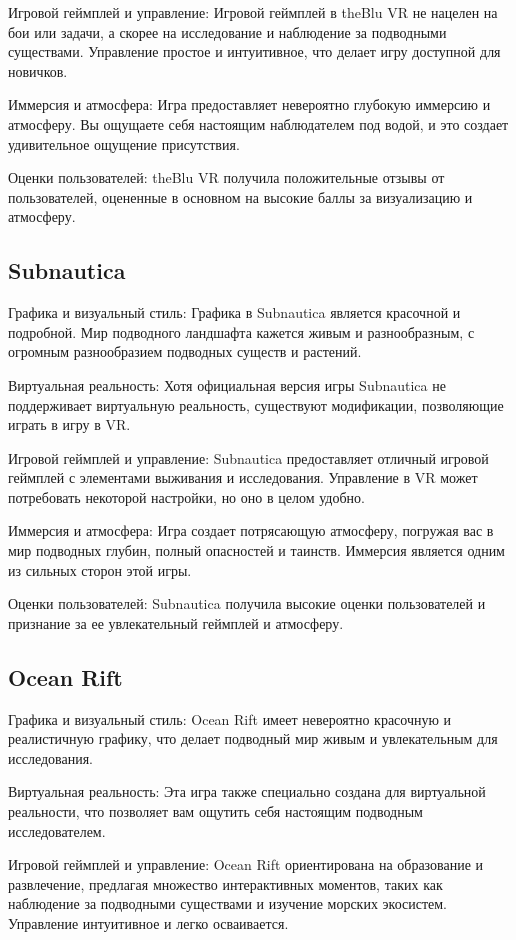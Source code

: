 \documentclass{../mirea-prog-lang}
\begin{document}
Игровой геймплей и управление:
Игровой геймплей в theBlu VR не нацелен на бои или задачи, а скорее на исследование и наблюдение за подводными существами. Управление простое и интуитивное, что делает игру доступной для новичков.

Иммерсия и атмосфера:
Игра предоставляет невероятно глубокую иммерсию и атмосферу. Вы ощущаете себя настоящим наблюдателем под водой, и это создает удивительное ощущение присутствия.

Оценки пользователей:
theBlu VR получила положительные отзывы от пользователей, оцененные в основном на высокие баллы за визуализацию и атмосферу.

\subsection{Subnautica}

Графика и визуальный стиль:
Графика в Subnautica является красочной и подробной. Мир подводного ландшафта кажется живым и разнообразным, с огромным разнообразием подводных существ и растений.

Виртуальная реальность:
Хотя официальная версия игры Subnautica не поддерживает виртуальную реальность, существуют модификации, позволяющие играть в игру в VR.

Игровой геймплей и управление:
Subnautica предоставляет отличный игровой геймплей с элементами выживания и исследования. Управление в VR может потребовать некоторой настройки, но оно в целом удобно.

Иммерсия и атмосфера:
Игра создает потрясающую атмосферу, погружая вас в мир подводных глубин, полный опасностей и таинств. Иммерсия является одним из сильных сторон этой игры.

Оценки пользователей:
Subnautica получила высокие оценки пользователей и признание за ее увлекательный геймплей и атмосферу.

\subsection{Ocean Rift}

Графика и визуальный стиль:
Ocean Rift имеет невероятно красочную и реалистичную графику, что делает подводный мир живым и увлекательным для исследования.

Виртуальная реальность:
Эта игра также специально создана для виртуальной реальности, что позволяет вам ощутить себя настоящим подводным исследователем.

Игровой геймплей и управление:
Ocean Rift ориентирована на образование и развлечение, предлагая множество интерактивных моментов, таких как наблюдение за подводными существами и изучение морских экосистем. Управление интуитивное и легко осваивается.
\end{document}
